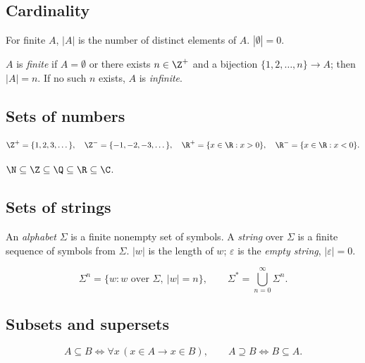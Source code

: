 \subsection{Cardinality}
\label{sec:1-3}
\begin{definition}[Cardinality]
For finite $A$, $|A|$ is the number of distinct elements of $A$. $|\emptyset| = 0$.
\end{definition}

\begin{definition}
$A$ is \emph{finite} if $A = \emptyset$ or there exists $n \in \Z^+$ and a bijection $\{1,2,\dots,n\} \to A$; then $|A| = n$. If no such $n$ exists, $A$ is \emph{infinite}.
\end{definition}

\subsection{Sets of numbers}
\label{sec:1-4}
\begin{definition}
\[
\Z^+ = \{1,2,3,\dots\}, \quad \Z^- = \{-1,-2,-3,\dots\}, \quad
\R^+ = \{x \in \R : x > 0\}, \quad \R^- = \{x \in \R : x < 0\}.
\]
\end{definition}

\begin{note}
$\N \subseteq \Z \subseteq \Q \subseteq \R \subseteq \C$.
\end{note}

\subsection{Sets of strings}
\label{sec:1-5}
\begin{definition}
An \emph{alphabet} $\Sigma$ is a finite nonempty set of symbols. A \emph{string} over $\Sigma$ is a finite sequence of symbols from $\Sigma$. $|w|$ is the length of $w$; $\varepsilon$ is the \emph{empty string}, $|\varepsilon| = 0$.
\end{definition}

\begin{definition}
\[
\Sigma^n = \{w : w \text{ over } \Sigma,\ |w| = n\}, \qquad
\Sigma^* = \bigcup_{n=0}^{\infty} \Sigma^n.
\]
\end{definition}

\subsection{Subsets and supersets}
\label{sec:1-6}
\begin{definition}
\[
A \subseteq B \iff \forall x\,(x \in A \rightarrow x \in B), \qquad
A \supseteq B \iff B \subseteq A.
\]
\end{definition}


